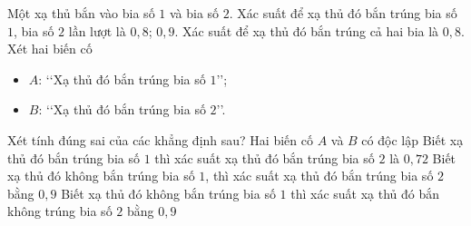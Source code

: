 \begin{ex}%
	Một xạ thủ bắn vào bia số $1$ và bia số $2$. Xác suất để xạ thủ đó bắn trúng bia số $1$, bia số $2$ lần lượt là $0{,}8$; $0{,}9$. Xác suất để xạ thủ đó bắn trúng cả hai bia là $0{,}8$. Xét hai biến cố
	\begin{itemize}
		\item  $A$: \lq\lq Xạ thủ đó bắn trúng bia số $1$\rq\rq;
		\item  $B$: \lq\lq Xạ thủ đó bắn trúng bia số $2$\rq\rq.
	\end{itemize}
	Xét tính đúng sai của các khẳng định sau?
	\choiceTF
	{Hai biến cố $A$ và $B$ có độc lập}
	{Biết xạ thủ đó bắn trúng bia số $1$ thì xác suất xạ thủ đó bắn trúng bia số $2$ là $0{,}72$}
	{\True Biết xạ thủ đó không bắn trúng bia số $1$, thì xác suất xạ thủ đó bắn trúng bia số $2$ bằng $0{,}9$}
	{Biết xạ thủ đó không bắn trúng bia số $1$ thì xác suất xạ thủ đó bắn không trúng bia số $2$ bằng $0{,}9$}
\end{ex}

